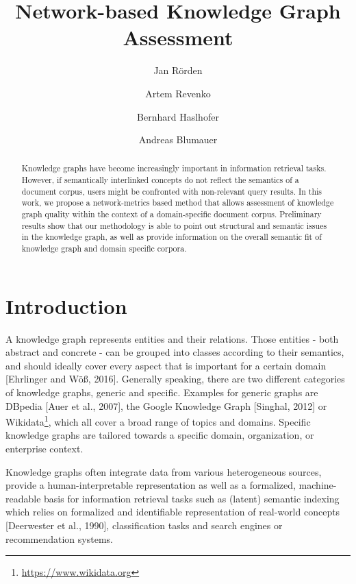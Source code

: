\documentclass[runningheads,a4paper]{llncs}
\begin{document}
\mainmatter

\title{Network-based Knowledge Graph Assessment}

\author{Jan Rörden \and
Artem Revenko \and
Bernhard Haslhofer \and
Andreas Blumauer}
\maketitle

\begin{abstract}
Knowledge graphs have become increasingly important in information retrieval tasks. However, if semantically interlinked concepts do not reflect the semantics of a document corpus, users might be confronted with non-relevant query results. In this work, we propose a network-metrics based method that allows assessment of knowledge graph quality within the context of a domain-specific document corpus. Preliminary results show that our methodology is able to point out structural and semantic issues in the knowledge graph, as well as provide information on the overall semantic fit of knowledge graph and domain specific corpora.
\end{abstract}


\section{Introduction}

A knowledge graph represents entities and their relations. Those entities - both abstract and concrete - can be grouped into classes according to their semantics, and should ideally cover every aspect that is important for a certain domain [Ehrlinger and Wöß, 2016]. Generally speaking, there are two different categories of knowledge graphs, generic and specific. Examples for generic graphs are DBpedia [Auer et al., 2007], the Google Knowledge Graph [Singhal, 2012] or Wikidata\footnote{\url{https://www.wikidata.org}}, which all cover a broad range of topics and domains. Specific knowledge graphs are tailored towards a specific domain, organization, or enterprise context.

Knowledge graphs often integrate data from various heterogeneous sources, provide a human-interpretable representation as well as a formalized, machine-readable basis for information retrieval tasks such as (latent) semantic indexing which relies on formalized and identifiable representation of real-world concepts [Deerwester et al., 1990], classification tasks and search engines or recommendation systems.
\end{document}
